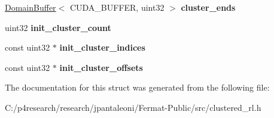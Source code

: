 \begin{DoxyCompactItemize}
\item 
\mbox{\label{struct_adaptive_clustered_r_l_storage_a77cd5964440b31b95a4d696591a9532a}} 
\hyperlink{class_domain_buffer}{Domain\+Buffer}$<$ C\+U\+D\+A\+\_\+\+B\+U\+F\+F\+ER, uint32 $>$ {\bfseries cluster\+\_\+ends}
\item 
\mbox{\label{struct_adaptive_clustered_r_l_storage_aa4dbeb8928b896b46c71ad5781f8c654}} 
uint32 {\bfseries init\+\_\+cluster\+\_\+count}
\item 
\mbox{\label{struct_adaptive_clustered_r_l_storage_a4a16d1da9e965f29aa0f3be69c1e0c99}} 
const uint32 $\ast$ {\bfseries init\+\_\+cluster\+\_\+indices}
\item 
\mbox{\label{struct_adaptive_clustered_r_l_storage_acda4a136b198abcdbad80751e9ab3bfe}} 
const uint32 $\ast$ {\bfseries init\+\_\+cluster\+\_\+offsets}
\end{DoxyCompactItemize}


The documentation for this struct was generated from the following file\+:\begin{DoxyCompactItemize}
\item 
C\+:/p4research/research/jpantaleoni/\+Fermat-\/\+Public/src/clustered\+\_\+rl.\+h\end{DoxyCompactItemize}
